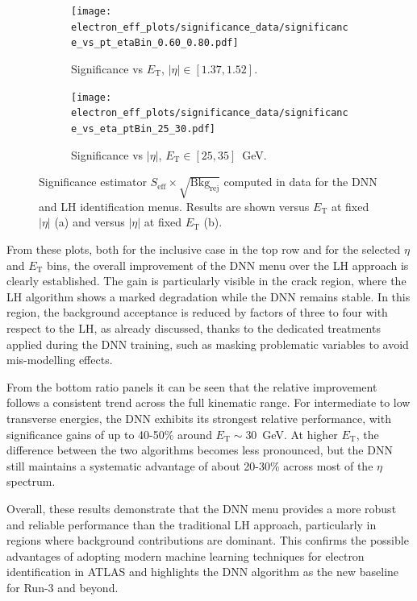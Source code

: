 \begin{figure}[htbp]
  \centering

  \begin{subfigure}{0.48\textwidth}
    \centering
    \texttt{[image: electron\_eff\_plots/significance\_data/significance\_vs\_pt\_etaBin\_0.60\_0.80.pdf]}
    \caption{\small{Significance vs $E_{\mathrm{T}}$, $|\eta|\in[1.37,1.52]$.}}
    \label{fig:significance_vs_pt_etaBin}
  \end{subfigure}\hfill
  \begin{subfigure}{0.48\textwidth}
    \centering
    \texttt{[image: electron\_eff\_plots/significance\_data/significance\_vs\_eta\_ptBin\_25\_30.pdf]}
    \caption{\small{Significance vs $|\eta|$, $E_{\mathrm{T}}\in[25,35]$~GeV.}}
    \label{fig:significance_vs_eta_ptBin}
  \end{subfigure}

  \caption{Significance estimator $S_{\mathrm{eff}} \times \sqrt{\mathrm{Bkg}_{\mathrm{rej}}}$ 
  computed in data for the DNN and LH identification menus. 
  Results are shown versus $E_{\mathrm{T}}$ at fixed $|\eta|$ (a) and versus $|\eta|$ at fixed $E_{\mathrm{T}}$ (b).}
  \label{fig:significance_bins}
\end{figure}


From these plots, both for the inclusive case in the top row and for the selected $\eta$ and $E_{\mathrm{T}}$ bins, 
the overall improvement of the DNN menu over the LH approach is clearly established. 
The gain is particularly visible in the crack region, where the LH algorithm shows a marked degradation while the DNN remains stable. 
In this region, the background acceptance is reduced by factors of three to four with respect to the LH, as already discussed, 
thanks to the dedicated treatments applied during the DNN training, such as masking problematic variables to avoid mis-modelling effects. 

From the bottom ratio panels it can be seen that the relative improvement follows a consistent trend across the full kinematic range. 
For intermediate to low transverse energies, the DNN exhibits its strongest relative performance, with significance gains of up to 40-50\% around $E_{\mathrm{T}} \sim 30$~GeV. 
At higher $E_{\mathrm{T}}$, the difference between the two algorithms becomes less pronounced, but the DNN still maintains a systematic advantage of about 20-30\% across most of the $\eta$ spectrum. 

Overall, these results demonstrate that the DNN menu provides a more robust and reliable performance than the traditional LH approach, 
particularly in regions where background contributions are dominant. 
This confirms the possible advantages of adopting modern machine learning techniques for electron identification in ATLAS and 
highlights the DNN algorithm as the new baseline for Run-3 and beyond.

